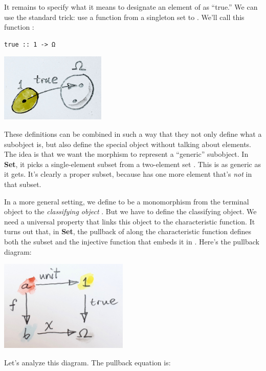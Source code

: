 It remains to specify what it means to designate an element of
 as ``true.'' We can use the standard trick: use a function
from a singleton set to . We'll call this function
:

\begin{Verbatim}[commandchars=\\\{\}]
true :: 1 -> Ω
\end{Verbatim}

\includegraphics[width=1.97917in]{images/true.jpg}

These definitions can be combined in such a way that they not only
define what a subobject is, but also define the special object
 without talking about elements. The idea is that we want the
morphism  to represent a ``generic'' subobject. In
\textbf{Set}, it picks a single-element subset from a two-element set
. This is as generic as it gets. It's clearly a proper subset,
because  has one more element that's \emph{not} in that
subset.

In a more general setting, we define  to be a monomorphism
from the terminal object to the \emph{classifying object} .
But we have to define the classifying object. We need a universal
property that links this object to the characteristic function. It turns
out that, in \textbf{Set}, the pullback of  along the
characteristic function  defines both the subset 
and the injective function that embeds it in . Here's the
pullback diagram:

\includegraphics[width=2.41667in]{images/pullback.jpg}

Let's analyze this diagram. The pullback equation is:

